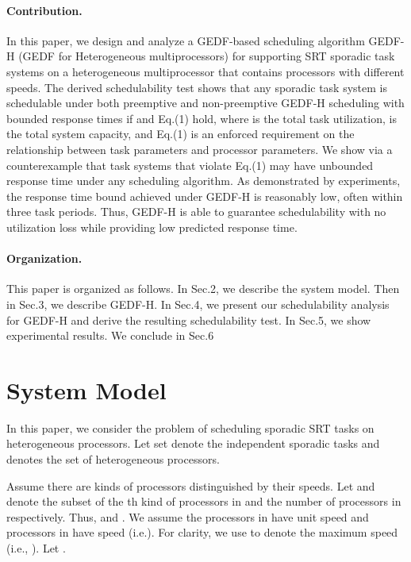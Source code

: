 \documentclass[Times, 10pt,twocolumn]{article}
\theoremstyle{definition}
\begin{document}
\paragraph{Contribution.} 
In this paper, we design and analyze a GEDF-based scheduling algorithm GEDF-H (GEDF for Heterogeneous multiprocessors) for supporting SRT sporadic task systems on a heterogeneous multiprocessor that contains processors with different speeds. The derived schedulability test shows that any sporadic task system is schedulable under both preemptive and non-preemptive GEDF-H scheduling with bounded response times if  and Eq.(1) hold, where  is the total task utilization,  is the total system capacity, and Eq.(1) is an enforced requirement on the relationship between task parameters and processor parameters. We show via a counterexample that task systems that violate Eq.(1) may have unbounded response time under any scheduling algorithm. As demonstrated by experiments, the response time bound achieved under GEDF-H is reasonably low, often within three task periods. Thus, GEDF-H is able to guarantee schedulability with no utilization loss while providing low predicted response time.



\paragraph{Organization.} This paper is organized as follows. In Sec.2, we describe the system model. Then in Sec.3, we describe GEDF-H. In Sec.4, we present our schedulability analysis for GEDF-H and derive the resulting schedulability test. In Sec.5, we show experimental results. We conclude in Sec.6



\section{System Model}
\label{sec:model}

In this paper, we consider the problem of scheduling  sporadic SRT tasks on  heterogeneous processors. Let set  denote the  independent sporadic tasks and  denotes the set of  heterogeneous processors.

Assume there are  kinds of processors distinguished by their speeds. Let   and  denote the subset of the th kind of processors in  and the number of processors in  respectively. Thus,  and . We assume the processors in  have unit speed and processors in  have speed  (i.e.). For clarity, we use  to denote the maximum speed (i.e., ). Let . 
\end{document}
